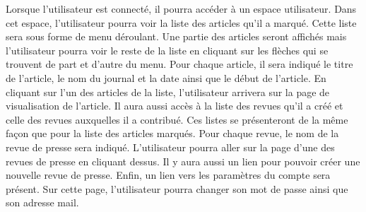 \textbf{}



Lorsque l'utilisateur est connecté, il pourra accéder à un espace utilisateur. Dans cet espace, l'utilisateur pourra voir la liste des articles qu'il a marqué. Cette liste sera sous forme de menu déroulant. Une partie des articles seront affichés mais l'utilisateur pourra voir le reste de la liste en cliquant sur les flèches qui se trouvent de part et d'autre du menu. Pour chaque article, il sera indiqué le titre de l'article, le nom du journal et la date ainsi que le début de l'article. En cliquant sur l'un des articles de la liste, l'utilisateur arrivera sur la page de visualisation de l'article.
Il aura aussi accès à la liste des revues qu'il a créé et celle des revues auxquelles il a contribué. Ces listes se présenteront de la même façon que pour la liste des articles marqués. Pour chaque revue, le nom de la revue de presse sera indiqué. L'utilisateur pourra aller sur la page d'une des revues de presse en cliquant dessus.
Il y aura aussi un lien pour pouvoir créer une nouvelle revue de presse. 
Enfin, un lien vers les paramètres du compte sera présent.  Sur cette page, l'utilisateur pourra changer son mot de passe ainsi que son adresse mail.
